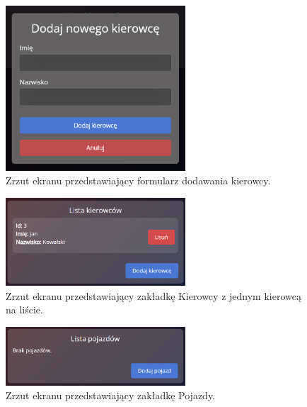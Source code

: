 \begin{figure}
	\centering
	\includegraphics[width=0.6\textwidth]{./graf/add_driver.png}
	\caption{Zrzut ekranu przedstawiający formularz dodawania kierowcy.}
	\label{fig:4.6}
\end{figure}

\begin{figure}
	\centering
	\includegraphics[width=0.6\textwidth]{./graf/driver_tab_2.png}
	\caption{Zrzut ekranu przedstawiający zakładkę Kierowcy z jednym kierowcą na liście.}
	\label{fig:4.7}
\end{figure}

\begin{figure}
	\centering
	\includegraphics[width=0.6\textwidth]{./graf/vehicle_tab.png}
	\caption{Zrzut ekranu przedstawiający zakładkę Pojazdy.}
	\label{fig:4.8}
\end{figure}

